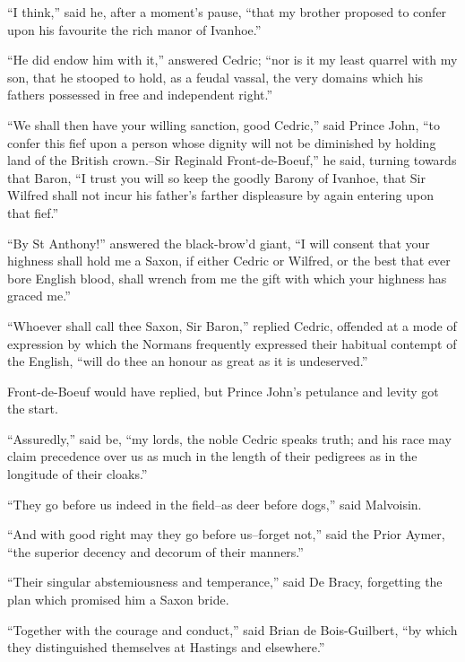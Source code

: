 ``I think,'' said he, after a moment's pause, ``that my brother proposed
to confer upon his favourite the rich manor of Ivanhoe.''

``He did endow him with it,'' answered Cedric; ``nor is it my least
quarrel with my son, that he stooped to hold, as a feudal vassal, the
very domains which his fathers possessed in free and independent
right.''

``We shall then have your willing sanction, good Cedric,'' said Prince
John, ``to confer this fief upon a person whose dignity will not be
diminished by holding land of the British crown.--Sir Reginald
Front-de-Boeuf,'' he said, turning towards that Baron, ``I trust you
will so keep the goodly Barony of Ivanhoe, that Sir Wilfred shall not
incur his father's farther displeasure by again entering upon that
fief.''

``By St Anthony!'' answered the black-brow'd giant, ``I will consent
that your highness shall hold me a Saxon, if either Cedric or Wilfred,
or the best that ever bore English blood, shall wrench from me the gift
with which your highness has graced me.''

``Whoever shall call thee Saxon, Sir Baron,'' replied Cedric, offended
at a mode of expression by which the Normans frequently expressed their
habitual contempt of the English, ``will do thee an honour as great as
it is undeserved.''

Front-de-Boeuf would have replied, but Prince John's petulance and
levity got the start.

``Assuredly,'' said be, ``my lords, the noble Cedric speaks truth; and
his race may claim precedence over us as much in the length of their
pedigrees as in the longitude of their cloaks.''

``They go before us indeed in the field--as deer before dogs,'' said
Malvoisin.

``And with good right may they go before us--forget not,'' said the
Prior Aymer, ``the superior decency and decorum of their manners.''

``Their singular abstemiousness and temperance,'' said De Bracy,
forgetting the plan which promised him a Saxon bride.

``Together with the courage and conduct,'' said Brian de Bois-Guilbert,
``by which they distinguished themselves at Hastings and elsewhere.''


